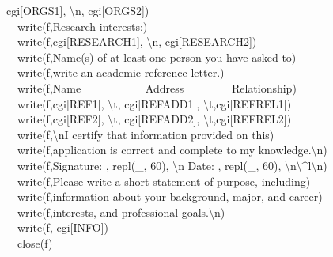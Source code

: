 {{cgi[{\textquotedbl}ORGS1{\textquotedbl}],
{\textquotedbl}{\textbackslash}n{\textquotedbl},
cgi[{\textquotedbl}ORGS2{\textquotedbl}]) \\
\ \ write(f,{\textquotedbl}Research interests:{\textquotedbl}) \\
\ \ write(f,cgi[{\textquotedbl}RESEARCH1{\textquotedbl}],
{\textquotedbl}{\textbackslash}n{\textquotedbl},
cgi[{\textquotedbl}RESEARCH2{\textquotedbl}]) \\
\ \ write(f,{\textquotedbl}Name(s) of at least one person you have asked
to{\textquotedbl}) \\
\ \ write(f,{\textquotedbl}write an academic reference
letter.{\textquotedbl}) \\
\ \ write(f,{\textquotedbl}Name \ \ \ \ \ \ \ \ \ \ \ Address
\ \ \ \ \ \ \ \ Relationship{\textquotedbl}) \\
\ \ write(f,cgi[{\textquotedbl}REF1{\textquotedbl}],
{\textquotedbl}{\textbackslash}t{\textquotedbl},
cgi[{\textquotedbl}REFADD1{\textquotedbl}],
{\textquotedbl}{\textbackslash}t{\textquotedbl},cgi[{\textquotedbl}REFREL1{\textquotedbl}]) \\
\ \ write(f,cgi[{\textquotedbl}REF2{\textquotedbl}],
{\textquotedbl}{\textbackslash}t{\textquotedbl},
cgi[{\textquotedbl}REFADD2{\textquotedbl}],
{\textquotedbl}{\textbackslash}t{\textquotedbl},cgi[{\textquotedbl}REFREL2{\textquotedbl}]) \\
\ \ write(f,{\textquotedbl}{\textbackslash}nI certify that information
provided on this{\textquotedbl}) \\
\ \ write(f,{\textquotedbl}application is correct and complete to my
knowledge.{\textbackslash}n{\textquotedbl}) \\
\ \ write(f,{\textquotedbl}Signature: {\textquotedbl},
repl({\textquotedbl}\_{\textquotedbl}, 60), {\textquotedbl}{\textbackslash}n Date: {\textquotedbl},
repl({\textquotedbl}\_{\textquotedbl}, 60), 
{\textquotedbl}{\textbackslash}n{\textbackslash}\^{}l{\textbackslash}n{\textquotedbl}) \\
\ \ write(f,{\textquotedbl}Please write a short statement of purpose,
including{\textquotedbl}) \\
\ \ write(f,{\textquotedbl}information about your background, major, and
career{\textquotedbl}) \\
\ \ write(f,{\textquotedbl}interests, and professional
goals.{\textbackslash}n{\textquotedbl}) \\
\ \ write(f, cgi[{\textquotedbl}INFO{\textquotedbl}]) \\
\ \ close(f) \\
}}
